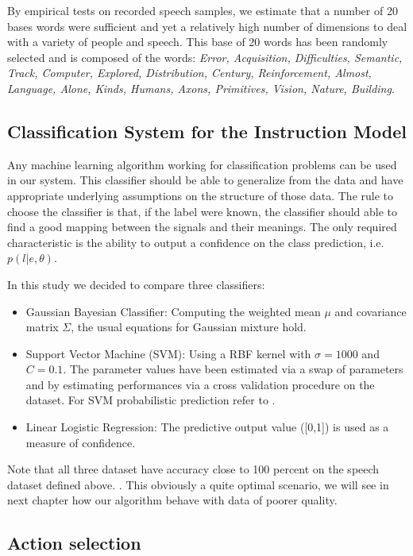 By empirical tests on recorded speech samples, we estimate that a number of 20 bases words were sufficient and yet a relatively high number of dimensions to deal with a variety of people and speech. This base of 20 words has been randomly selected and is composed of the words:\emph{ \footnotesize{Error, Acquisition, Difficulties, Semantic, Track, Computer, Explored, Distribution, Century, Reinforcement, Almost, Language, Alone, Kinds, Humans, Axons, Primitives, Vision, Nature, Building}}.

\subsection{Classification System for the Instruction Model}

Any machine learning algorithm working for classification problems can be used in our system. This classifier should be able to generalize from the data and have appropriate underlying assumptions on the structure of those data. The rule to choose the classifier is that, if the label were known, the classifier should able to find a good mapping between the signals and their meanings. The only required characteristic is the ability to output a confidence on the class prediction, i.e. $p(l|e, \theta)$.

In this study we decided to compare three classifiers:
\begin{itemize}
\item Gaussian Bayesian Classifier: Computing the weighted mean $\mu$ and covariance matrix $\Sigma$, the usual equations for Gaussian mixture hold.
\item Support Vector Machine (SVM): Using a RBF kernel with $\sigma = 1000$ and $C = 0.1$. The parameter values have been estimated via a swap of parameters and by estimating performances via a cross validation procedure on the dataset. For SVM probabilistic prediction refer to \cite{platt1999probabilistic}.
\item Linear Logistic Regression: The predictive output value ([0,1]) is used as a measure of confidence.
\end{itemize}

Note that all three dataset have accuracy close to 100 percent on the speech dataset defined above. . This obviously a quite optimal scenario, we will see in next chapter  how our algorithm behave with data of poorer quality.

\subsection{Action selection}

